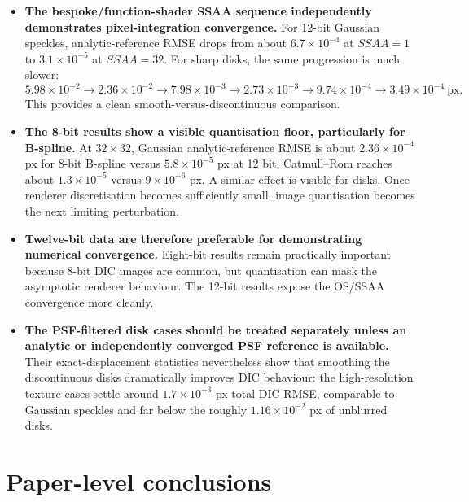 \documentclass[11pt,a4paper]{article}
\begin{document}
\begin{itemize}
\item \textbf{The bespoke/function-shader SSAA sequence independently demonstrates pixel-integration convergence.}
For 12-bit Gaussian speckles, analytic-reference RMSE drops from about $6.7\times10^{-4}$ at $SSAA=1$ to $3.1\times10^{-5}$ at $SSAA=32$. For sharp disks, the same progression is much slower:
\[
5.98\times10^{-2}
\rightarrow 2.36\times10^{-2}
\rightarrow 7.98\times10^{-3}
\rightarrow 2.73\times10^{-3}
\rightarrow 9.74\times10^{-4}
\rightarrow 3.49\times10^{-4}\ \mathrm{px}.
\]
This provides a clean smooth-versus-discontinuous comparison.

\item \textbf{The 8-bit results show a visible quantisation floor, particularly for B-spline.}
At $32\times32$, Gaussian analytic-reference RMSE is about $2.36\times10^{-4}$ px for 8-bit B-spline versus $5.8\times10^{-5}$ px at 12 bit. Catmull--Rom reaches about $1.3\times10^{-5}$ versus $9\times10^{-6}$ px. A similar effect is visible for disks. Once renderer discretisation becomes sufficiently small, image quantisation becomes the next limiting perturbation.

\item \textbf{Twelve-bit data are therefore preferable for demonstrating numerical convergence.}
Eight-bit results remain practically important because 8-bit DIC images are common, but quantisation can mask the asymptotic renderer behaviour. The 12-bit results expose the OS/SSAA convergence more cleanly.

\item \textbf{The PSF-filtered disk cases should be treated separately unless an analytic or independently converged PSF reference is available.}
Their exact-displacement statistics nevertheless show that smoothing the discontinuous disks dramatically improves DIC behaviour: the high-resolution texture cases settle around $1.7\times10^{-3}$ px total DIC RMSE, comparable to Gaussian speckles and far below the roughly $1.16\times10^{-2}$ px of unblurred disks.

\end{itemize}

\section*{Paper-level conclusions}
\end{document}
